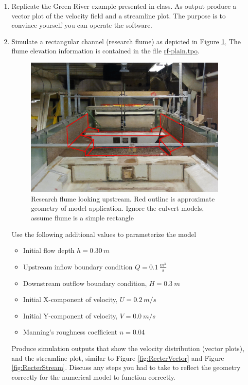 \documentclass[12pt]{article}
\begin{document}
\begin{enumerate}
\item Replicate the Green River example presented in class.  
As output produce a vector plot of the velocity field  and a streamline plot.
The purpose is to convince yourself you can operate the software.

\item Simulate a rectangular channel (research flume) as depicted in Figure \ref{fig:ResearchFlumePlain},
The flume elevation information is contained in the file \url{rf-plain.tpo}.  

\begin{figure}[h!] %
   \centering
   \includegraphics[width=4in]{researchflume.jpg} 
   \caption{Research flume looking upstream.  Red outline is approximate geometry of model application.  Ignore the culvert models, assume flume is a simple rectangle}
   \label{fig:ResearchFlumePlain}
\end{figure}

   Use the  following additional values to parameterize the model
\begin{itemize}
\item Initial flow depth $h = 0.30 ~ m$
\item Upstream inflow boundary condition $Q= 0.1~\frac{m^3}{s}$
\item Downstream outflow boundary condition, $H = 0.3~m$
\item Initial X-component of velocity, $U = 0.2~m/s$
\item Initial Y-component of velocity, $V = 0.0~m/s$
\item Manning's roughness coefficient $n= 0.04$
\end{itemize}

Produce simulation outputs that show the velocity distribution (vector plots), and the streamline plot, similar to Figure \ref{fig:RecterVector} and Figure \ref{fig:RecterStream}.
Discuss any steps you had to take to reflect the geometry correctly for the numerical model to function correctly.


\end{enumerate}
\end{document}
